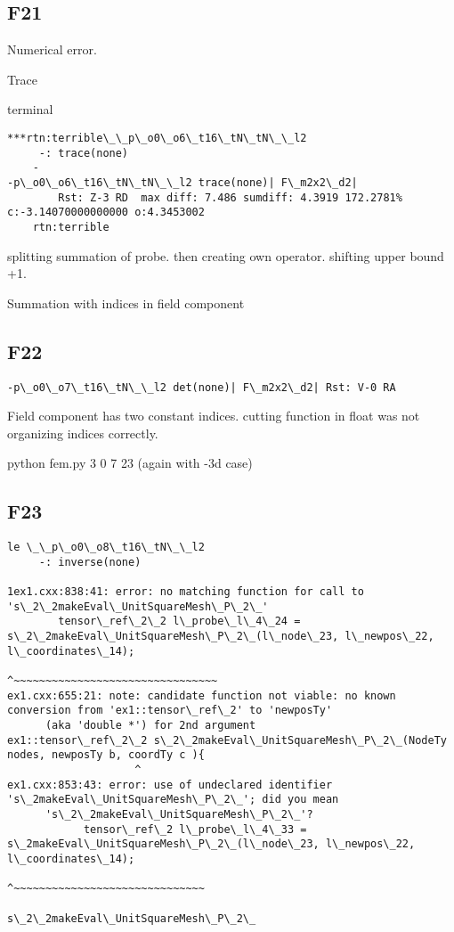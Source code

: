 \subsection{F21}
\begin{description}[noitemsep]
\item[issue] Numerical error. 
\item[computation] Trace
\item[output] terminal\\
\begin{lstlisting}[mathescape=true]
***rtn:terrible\_\_p\_o0\_o6\_t16\_tN\_tN\_\_l2
	 -: trace(none)
	-
-p\_o0\_o6\_t16\_tN\_tN\_\_l2 trace(none)| F\_m2x2\_d2| 
		Rst: Z-3 RD  max diff: 7.486 sumdiff: 4.3919 172.2781% c:-3.14070000000000 o:4.3453002
	rtn:terrible
	\end{lstlisting}
\item[solution] splitting summation of probe. then creating own operator. shifting upper bound +1.
\item[details] Summation with indices in field component
\end{description}

\subsection{F22}
\begin{lstlisting}[mathescape=true]
-p\_o0\_o7\_t16\_tN\_\_l2 det(none)| F\_m2x2\_d2| Rst: V-0 RA
	\end{lstlisting}
Field component has two constant indices.
cutting function in float was not organizing indices correctly.

 python fem.py 3 0 7 23  (again with -3d case)
 

\subsection{F23}
\begin{lstlisting}[mathescape=true]
le \_\_p\_o0\_o8\_t16\_tN\_\_l2
	 -: inverse(none)
	 
1ex1.cxx:838:41: error: no matching function for call to 's\_2\_2makeEval\_UnitSquareMesh\_P\_2\_'
        tensor\_ref\_2\_2 l\_probe\_l\_4\_24 = s\_2\_2makeEval\_UnitSquareMesh\_P\_2\_(l\_node\_23, l\_newpos\_22, l\_coordinates\_14);
                                        ^~~~~~~~~~~~~~~~~~~~~~~~~~~~~~~~~
ex1.cxx:655:21: note: candidate function not viable: no known conversion from 'ex1::tensor\_ref\_2' to 'newposTy'
      (aka 'double *') for 2nd argument
ex1::tensor\_ref\_2\_2 s\_2\_2makeEval\_UnitSquareMesh\_P\_2\_(NodeTy nodes, newposTy b, coordTy c ){
                    ^
ex1.cxx:853:43: error: use of undeclared identifier 's\_2makeEval\_UnitSquareMesh\_P\_2\_'; did you mean
      's\_2\_2makeEval\_UnitSquareMesh\_P\_2\_'?
            tensor\_ref\_2 l\_probe\_l\_4\_33 = s\_2makeEval\_UnitSquareMesh\_P\_2\_(l\_node\_23, l\_newpos\_22, l\_coordinates\_14);
                                          ^~~~~~~~~~~~~~~~~~~~~~~~~~~~~~~
                                          s\_2\_2makeEval\_UnitSquareMesh\_P\_2\_
	\end{lstlisting}


